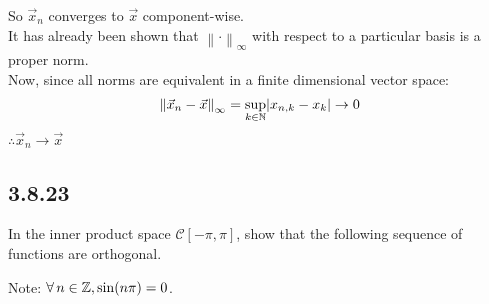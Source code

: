 \documentclass[letterpaper,12pt,fleqn]{article}
\newcommand{\vx}{\vec{x}}
\newcommand{\norm}[1]{\left\|#1\right\|}
\newcommand{\mc}{\mathcal{C}}
\begin{document}
So $\vx_n$ converges to $\vx$ component-wise. \\
It has already been shown that $\norm{\cdot}_{\infty}$ with respect to a
particular basis is a proper norm. \\
Now, since all norms are equivalent in a finite dimensional vector space:
\[\norm{\vx_n-\vx}_{\infty}=\sup_{k\in\N}\abs{x_{n,k}-x_k}\to0\]
$\therefore\vx_n\to\vx$

\subsection*{3.8.23}

In the inner product space $\mc[-\pi,\pi]$, show that the following sequence of
functions are orthogonal.

Note: $\forall\,n\in\mathbb{Z},\sin(n\pi)=0$.
\end{document}
